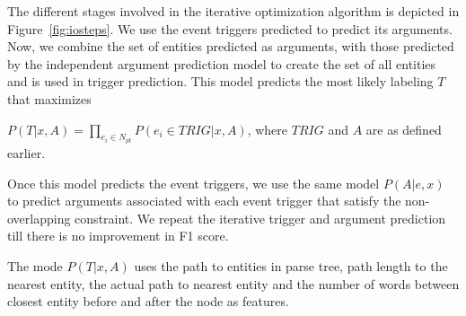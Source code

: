 The different stages involved in the iterative optimization algorithm is depicted in Figure~\ref{fig:iosteps}. We use the event triggers predicted to predict its arguments. Now, we combine the set of entities predicted as arguments, with those predicted by the independent argument prediction model to create the set of all entities and is used in trigger prediction. This model predicts the most likely labeling $T$ that maximizes

$P(T | x, A) = \prod_{e_{i}\in N_{pt}} P(e_{i}\in TRIG | x, A) $, where $TRIG$ and $A$ are as defined earlier.

Once this model predicts the event triggers, we use the same model $P(A | e,x)$ to predict arguments associated with each event trigger that satisfy the non-overlapping constraint. We repeat the iterative trigger and argument prediction till there is no improvement in F1 score.

The mode $P(T | x, A)$ uses the path to entities in parse tree, path length to the nearest entity, the actual path to nearest entity and the number of words between closest entity before and after the node as features.
